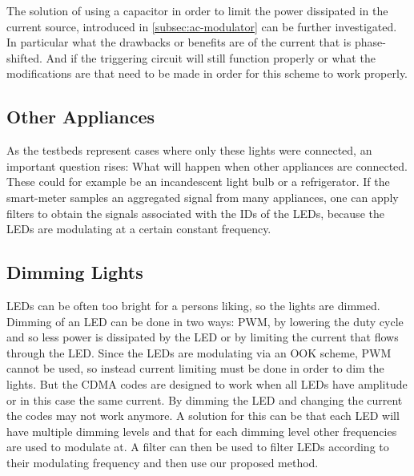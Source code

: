 	The solution of using a capacitor in order to limit the power dissipated in the current source, introduced in \autoref{subsec:ac-modulator} can be further investigated.
	In particular what the drawbacks or benefits are of the current that is phase-shifted.
	And if the triggering circuit will still function properly or what the modifications are that need to be made in order for this scheme to work properly.


	\subsection{Other Appliances}

	As the testbeds represent cases where only these lights were connected, an important question rises: What will happen when other appliances are connected.
	These could for example be an incandescent light bulb or a refrigerator.
	If the smart-meter samples an aggregated signal from many appliances, one can apply filters to obtain the signals associated with the IDs of the LEDs, because the LEDs are modulating at a certain constant frequency.



	\subsection{Dimming Lights}

	LEDs can be often too bright for a persons liking, so the lights are dimmed.
	Dimming of an LED can be done in two ways: PWM, by lowering the duty cycle and so less power is dissipated by the LED or by limiting the current that flows through the LED.
	Since the LEDs are modulating via an OOK scheme, PWM cannot be used, so instead current limiting must be done in order to dim the lights.
	But the CDMA codes are designed to work when all LEDs have amplitude or in this case the same current.
	By dimming the LED and changing the current the codes may not work anymore.
	A solution for this can be that each LED will have multiple dimming levels and that for each dimming level other frequencies are used to modulate at.
	A filter can then be used to filter LEDs according to their modulating frequency and then use our proposed method.



